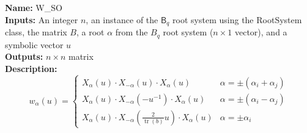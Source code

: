 \documentclass[12pt]{article}
\theoremstyle{definition}
\numberwithin{theorem}{subsection}
\newcommand{\lp}{\left(}
\newcommand{\rp}{\right)}
\newcommand{\tbf}{\textbf}
\newcommand{\noi}{\noindent}
\newcommand{\inv}{^{-1}}
\DeclareMathOperator{\tr}{tr}
\begin{document}
\begin{framed}
\noi \tbf{Name:} W\_SO \\
\noi \tbf{Inputs:} An integer $n$, an instance of the $\mathsf{B}_{q}$ root system using the RootSystem class, the matrix $B$, a root $\alpha$ from the $B_{q}$ root system ($n \times 1$ vector), and a symbolic vector $u$ \\
\noi \tbf{Outputs:} $n \times n$ matrix \\
\noi \tbf{Description:}
\begin{equation*}
	w_\alpha(u) = 
	\begin{cases}
		X_{\alpha}(u) \cdot X_{-\alpha}(u) \cdot X_\alpha(u) & \alpha = \pm (\alpha_i + \alpha_j) \\
		X_\alpha(u) \cdot X_{-\alpha} \lp -u \inv \rp \cdot X_\alpha(u) & \alpha = \pm (\alpha_i - \alpha_j ) \\
		X_{\alpha}\lp u \rp \cdot X_{-\alpha} \lp \frac{2}{\tr(b)} u \rp \cdot X_{\alpha} \lp u \rp & \alpha = \pm \alpha_i
	\end{cases}
\end{equation*}
\end{framed}
\end{document}
